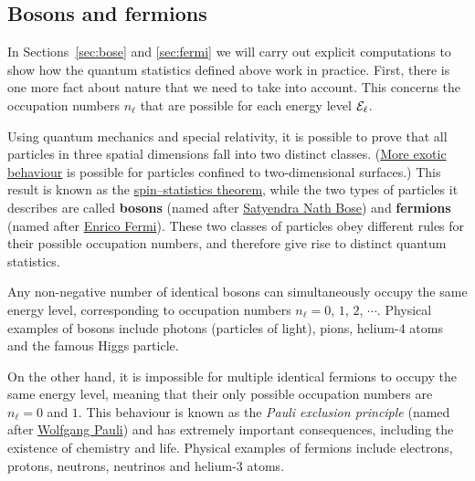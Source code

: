 \subsection{Bosons and fermions}
In Sections~\ref{sec:bose} and \ref{sec:fermi} we will carry out explicit computations to show how the quantum statistics defined above work in practice.
First, there is one more fact about nature that we need to take into account.
This concerns the occupation numbers $n_{\ell}$ that are possible for each energy level $\mathcal E_{\ell}$.

Using quantum mechanics and special relativity, it is possible to prove that all particles in three spatial dimensions fall into two distinct classes.
(\href{https://en.wikipedia.org/wiki/Anyon}{More exotic behaviour} is possible for particles confined to two-dimensional surfaces.)
This result is known as the \href{https://en.wikipedia.org/wiki/Spin-statistics_theorem}{spin--statistics theorem}, while the two types of particles it describes are called \textbf{bosons} (named after \href{https://en.wikipedia.org/wiki/Satyendra_Nath_Bose}{Satyendra Nath Bose}) and \textbf{fermions} (named after \href{https://en.wikipedia.org/wiki/Enrico_Fermi}{Enrico Fermi}).
These two classes of particles obey different rules for their possible occupation numbers, and therefore give rise to distinct quantum statistics.

Any non-negative number of identical bosons can simultaneously occupy the same energy level, corresponding to occupation numbers $n_{\ell} = 0$, $1$, $2$, $\cdots$.
Physical examples of bosons include photons (particles of light), pions, helium-$4$ atoms and the famous Higgs particle.

On the other hand, it is impossible for multiple identical fermions to occupy the same energy level, meaning that their only possible occupation numbers are $n_{\ell} = 0$ and $1$.
This behaviour is known as the \textit{Pauli exclusion principle} (named after \href{https://en.wikipedia.org/wiki/Wolfgang_Pauli}{Wolfgang Pauli}) and has extremely important consequences, including the existence of chemistry and life.
Physical examples of fermions include electrons, protons, neutrons, neutrinos and helium-$3$ atoms.

